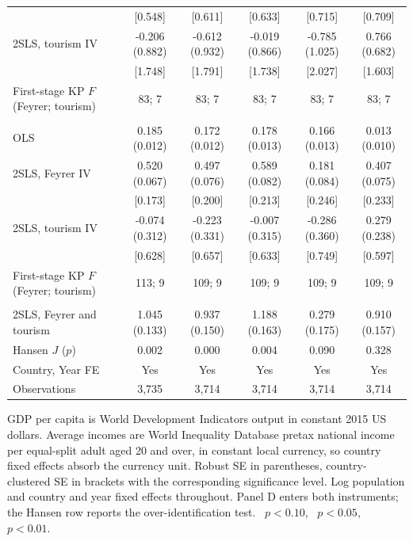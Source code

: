 \begin{table}[H]
\begin{threeparttable}
\begin{tabular}{lccccc}
 & [0.548]\sym{***} & [0.611]\sym{**} & [0.633]\sym{***} & [0.715] & [0.709]\sym{*} \\
2SLS, tourism IV & -0.206 (0.882) & -0.612 (0.932) & -0.019 (0.866) & -0.785 (1.025) & 0.766 (0.682) \\
 & [1.748] & [1.791] & [1.738] & [2.027] & [1.603] \\
First-stage KP $F$ (Feyrer; tourism) & 83; 7 & 83; 7 & 83; 7 & 83; 7 & 83; 7 \\
\addlinespace
\multicolumn{6}{l}{\emph{Panel C. Total connectivity, $\ln\mathrm{GACI}_{sum}$}}\\
OLS & 0.185\sym{***} (0.012) & 0.172\sym{***} (0.012) & 0.178\sym{***} (0.013) & 0.166\sym{***} (0.013) & 0.013 (0.010) \\
2SLS, Feyrer IV & 0.520\sym{***} (0.067) & 0.497\sym{***} (0.076) & 0.589\sym{***} (0.082) & 0.181\sym{**} (0.084) & 0.407\sym{***} (0.075) \\
 & [0.173]\sym{***} & [0.200]\sym{**} & [0.213]\sym{***} & [0.246] & [0.233]\sym{*} \\
2SLS, tourism IV & -0.074 (0.312) & -0.223 (0.331) & -0.007 (0.315) & -0.286 (0.360) & 0.279 (0.238) \\
 & [0.628] & [0.657] & [0.633] & [0.749] & [0.597] \\
First-stage KP $F$ (Feyrer; tourism) & 113; 9 & 109; 9 & 109; 9 & 109; 9 & 109; 9 \\
\addlinespace
\multicolumn{6}{l}{\emph{Panel D. Both instruments, $\ln\mathrm{GACI}_{max}$ (over-identified)}}\\
2SLS, Feyrer and tourism & 1.045\sym{***} (0.133) & 0.937\sym{***} (0.150) & 1.188\sym{***} (0.163) & 0.279 (0.175) & 0.910\sym{***} (0.157) \\
Hansen $J$ ($p$) & 0.002 & 0.000 & 0.004 & 0.090 & 0.328 \\
\midrule
Country, Year FE & Yes & Yes & Yes & Yes & Yes \\
Observations & 3,735 & 3,714 & 3,714 & 3,714 & 3,714 \\
\bottomrule
\end{tabular}
\begin{tablenotes}\footnotesize\item GDP per capita is World Development Indicators output in constant 2015 US dollars. Average incomes are World Inequality Database pretax national income per equal-split adult aged 20 and over, in constant local currency, so country fixed effects absorb the currency unit. Robust SE in parentheses, country-clustered SE in brackets with the corresponding significance level. Log population and country and year fixed effects throughout. Panel D enters both instruments; the Hansen row reports the over-identification test. \sym{*}~$p<0.10$, \sym{**}~$p<0.05$, \sym{***}~$p<0.01$.\end{tablenotes}\end{threeparttable}\end{table}

